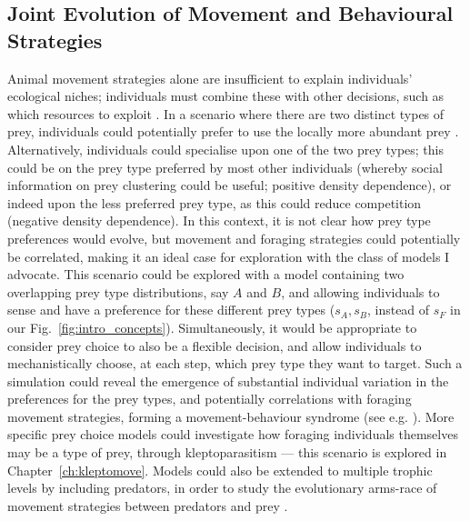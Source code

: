 \subsection*{Joint Evolution of Movement and Behavioural Strategies}

Animal movement strategies alone are insufficient to explain individuals' ecological niches; individuals must combine these with other decisions, such as which resources to exploit \parencite{vangils2015,pulliam1974}.
In a scenario where there are two distinct types of prey, individuals could potentially prefer to use the locally more abundant prey \parencite{emlen1966,pulliam1974}.
Alternatively, individuals could specialise upon one of the two prey types; this could be on the prey type preferred by most other individuals (whereby social information on prey clustering could be useful; positive density dependence), or indeed upon the less preferred prey type, as this could reduce competition (negative density dependence).
In this context, it is not clear how prey type preferences would evolve, but movement and foraging strategies could potentially be correlated, making it an ideal case for exploration with the class of models I advocate.
This scenario could be explored with a model containing two overlapping prey type distributions, say $A$ and $B$, and allowing individuals to sense and have a preference for these different prey types ($s_A, s_B$, instead of $s_F$ in our Fig.~\ref{fig:intro_concepts}).
Simultaneously, it would be appropriate to consider prey choice to also be a flexible decision, and allow individuals to mechanistically choose, at each step, which prey type they want to target.
Such a simulation could reveal the emergence of substantial individual variation in the preferences for the prey types, and potentially correlations with foraging movement strategies, forming a movement-behaviour syndrome (see e.g. \cite{eckhardt1979}).
More specific prey choice models could investigate how foraging individuals themselves may be a type of prey, through kleptoparasitism --- this scenario is explored in Chapter~\ref{ch:kleptomove}.
Models could also be extended to multiple trophic levels by including predators, in order to study the evolutionary arms-race of movement strategies between predators and prey \parencite{netz2021}.


